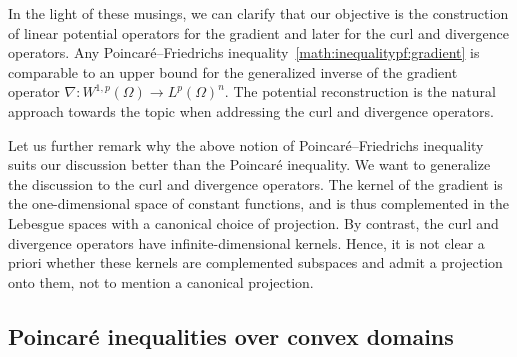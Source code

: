 \documentclass[a4paper]{amsart}
\begin{document}
In the light of these musings, we can clarify that our objective is the construction of linear potential operators for the gradient and later for the curl and divergence operators. 
Any Poincar\'e--Friedrichs inequality~\eqref{math:inequalitypf:gradient} is comparable to an upper bound for the generalized inverse of the gradient operator $\nabla : W^{1,p}(\Omega) \rightarrow L^{p}(\Omega)^{n}$. The potential reconstruction is the natural approach towards the topic when addressing the curl and divergence operators. 

\begin{remark}
    Let us further remark why the above notion of Poincar\'e--Friedrichs inequality suits our discussion better than the Poincar\'e inequality. 
    We want to generalize the discussion to the curl and divergence operators. 
    The kernel of the gradient is the one-dimensional space of constant functions, and is thus complemented in the Lebesgue spaces with a canonical choice of projection. 
    By contrast, the curl and divergence operators have infinite-dimensional kernels. 
    Hence, it is not clear a priori whether these kernels are complemented subspaces and admit a projection onto them, not to mention a canonical projection. 
\end{remark}




\subsection{Poincar\'e inequalities over convex domains}
\end{document}
